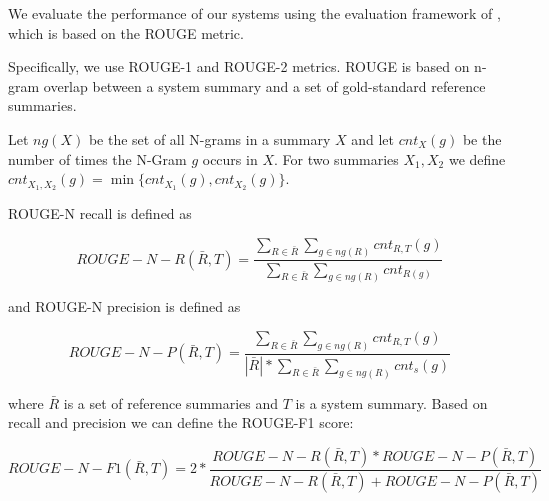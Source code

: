 \documentclass[a4paper,BCOR=10mm]{report}
\numberwithin{lemma}{chapter}
\numberwithin{definition}{chapter}
\begin{document}
We evaluate the performance of our systems using the evaluation framework of \citet{tilse}, which is based on the ROUGE \citep{rouge} metric.

Specifically, we use ROUGE-1 and ROUGE-2 metrics.
ROUGE is based on n-gram overlap between a system summary and a set of gold-standard reference summaries.

Let $\mathit{ng}(X)$ be the set of all N-grams in a summary $X$ and let $\mathit{cnt}_{X}(g)$ be the number of times the N-Gram $g$ occurs in $X$.
For two summaries $X_1, X_2$ we define $\mathit{cnt}_{X_1, X_2}(g) = \min\{  \mathit{cnt}_{X_1}(g),  \mathit{cnt}_{X_2}(g) \}$.

ROUGE-N recall is defined as

\begin{equation}
    \mathit{ROUGE-N-R}(\bar{R}, T) =  \frac{
        \sum_{R \in \bar{R}}
        \sum_{g \in \mathit{ng}(R)}
        \mathit{cnt}_{R,T}(g)
    } {
        \sum_{R \in \bar{R}}
        \sum_{g \in \mathit{ng}(R)}
        \mathit{cnt}_{R(g)}
    }
\end{equation}

and ROUGE-N precision is defined as

\begin{equation}
    \mathit{ROUGE-N-P}(\bar{R}, T) =  \frac{\sum_{R \in \bar{R}} \sum_{g \in \mathit{ng}(R)} \mathit{cnt}_{R,T}(g)}{|\bar{R}| * \sum_{R \in \bar{R}} \sum_{g \in \mathit{ng}(R)} \mathit{cnt}_{s}(g)}
\end{equation}

where $\bar{R}$ is a set of reference summaries and $T$ is a system summary.
Based on recall and precision we can define the ROUGE-F1 score:

\begin{equation}
    \mathit{ROUGE-N-F1}(\bar{R}, T) = 2 * \frac{\mathit{ROUGE-N-R}(\bar{R}, T) * \mathit{ROUGE-N-P}(\bar{R}, T)}{\mathit{ROUGE-N-R}(\bar{R}, T) + \mathit{ROUGE-N-P}(\bar{R}, T)}
\end{equation}
\end{document}
